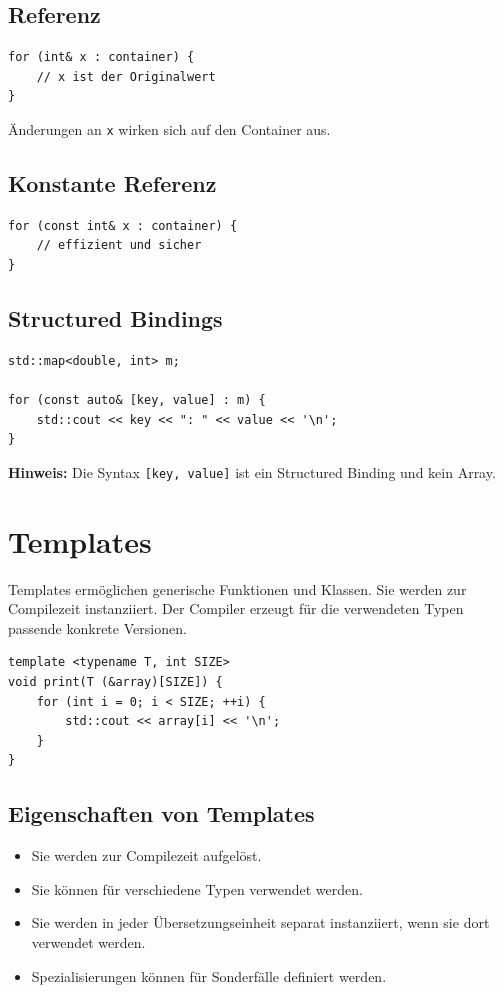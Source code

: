 \documentclass[11pt,a4paper]{article}
\newcommand{\code}[1]{\texttt{#1}}
\newcommand{\important}[1]{\textbf{#1}}
\begin{document}
\subsection{Referenz}
\begin{lstlisting}[caption={for-each mit Referenz}]
for (int& x : container) {
    // x ist der Originalwert
}
\end{lstlisting}
Änderungen an \code{x} wirken sich auf den Container aus.

\subsection{Konstante Referenz}
\begin{lstlisting}[caption={Best Practice: konstante Referenz}]
for (const int& x : container) {
    // effizient und sicher
}
\end{lstlisting}

\subsection{Structured Bindings}
\begin{lstlisting}[caption={Structured Binding bei std::map}]
std::map<double, int> m;

for (const auto& [key, value] : m) {
    std::cout << key << ": " << value << '\n';
}
\end{lstlisting}

\important{Hinweis:} Die Syntax \code{[key, value]} ist ein Structured Binding und kein Array.

\section{Templates}

Templates ermöglichen generische Funktionen und Klassen. Sie werden zur Compilezeit instanziiert. Der Compiler erzeugt für die verwendeten Typen passende konkrete Versionen.

\begin{lstlisting}[caption={Generische Funktion mit Template}]
template <typename T, int SIZE>
void print(T (&array)[SIZE]) {
    for (int i = 0; i < SIZE; ++i) {
        std::cout << array[i] << '\n';
    }
}
\end{lstlisting}

\subsection{Eigenschaften von Templates}
\begin{itemize}
  \item Sie werden zur Compilezeit aufgelöst.
  \item Sie können für verschiedene Typen verwendet werden.
  \item Sie werden in jeder Übersetzungseinheit separat instanziiert, wenn sie dort verwendet werden.
  \item Spezialisierungen können für Sonderfälle definiert werden.
\end{itemize}
\end{document}
